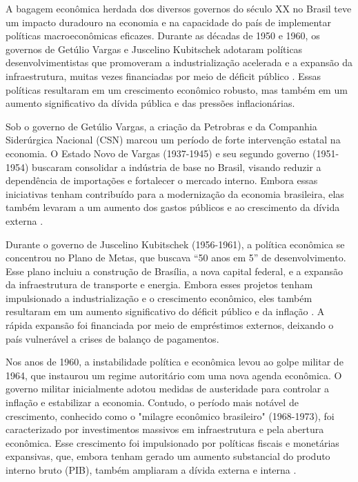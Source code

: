 \documentclass[12pt,oneside,a4paper,chapter=TITLE,english,brazil,sumario=abnt-6027-2012]{abntex2}
\begin{document}
A bagagem econômica herdada dos diversos governos do século XX no Brasil teve um impacto duradouro na economia e na capacidade do país de implementar políticas macroeconômicas eficazes. Durante as décadas de 1950 e 1960, os governos de Getúlio Vargas e Juscelino Kubitschek adotaram políticas desenvolvimentistas que promoveram a industrialização acelerada e a expansão da infraestrutura, muitas vezes financiadas por meio de déficit público \cite{bielschowsky_2022_a}. Essas políticas resultaram em um crescimento econômico robusto, mas também em um aumento significativo da dívida pública e das pressões inflacionárias.

Sob o governo de Getúlio Vargas, a criação da Petrobras e da Companhia Siderúrgica Nacional (CSN) marcou um período de forte intervenção estatal na economia. O Estado Novo de Vargas (1937-1945) e seu segundo governo (1951-1954) buscaram consolidar a indústria de base no Brasil, visando reduzir a dependência de importações e fortalecer o mercado interno. Embora essas iniciativas tenham contribuído para a modernização da economia brasileira, elas também levaram a um aumento dos gastos públicos e ao crescimento da dívida externa \cite{fabiogiambiagi_2016_economia}.

Durante o governo de Juscelino Kubitschek (1956-1961), a política econômica se concentrou no Plano de Metas, que buscava ``50 anos em 5'' de desenvolvimento. Esse plano incluiu a construção de Brasília, a nova capital federal, e a expansão da infraestrutura de transporte e energia. Embora esses projetos tenham impulsionado a industrialização e o crescimento econômico, eles também resultaram em um aumento significativo do déficit público e da inflação \cite{bielschowsky_2022_a}. A rápida expansão foi financiada por meio de empréstimos externos, deixando o país vulnerável a crises de balanço de pagamentos.

Nos anos de 1960, a instabilidade política e econômica levou ao golpe militar de 1964, que instaurou um regime autoritário com uma nova agenda econômica. O governo militar inicialmente adotou medidas de austeridade para controlar a inflação e estabilizar a economia. Contudo, o período mais notável de crescimento, conhecido como o "milagre econômico brasileiro" (1968-1973), foi caracterizado por investimentos massivos em infraestrutura e pela abertura econômica. Esse crescimento foi impulsionado por políticas fiscais e monetárias expansivas, que, embora tenham gerado um aumento substancial do produto interno bruto (PIB), também ampliaram a dívida externa e interna \cite{amaurypatrickgremaud_2009_economia}.
\end{document}
